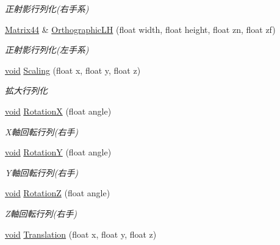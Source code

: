 \begin{DoxyCompactItemize}
\begin{DoxyCompactList}\small\item\em 正射影行列化(右手系) \end{DoxyCompactList}\item 
\mbox{\hyperlink{struct_effekseer_1_1_matrix44}{Matrix44}} \& \mbox{\hyperlink{struct_effekseer_1_1_matrix44_a8b53aee4d2c1598cbdd64ab6a6364af2}{Orthographic\+LH}} (float width, float height, float zn, float zf)
\begin{DoxyCompactList}\small\item\em 正射影行列化(左手系) \end{DoxyCompactList}\item 
\mbox{\hyperlink{namespace_effekseer_ab34c4088e512200cf4c2716f168deb56}{void}} \mbox{\hyperlink{struct_effekseer_1_1_matrix44_a973c274dff2d56d5f6b8453971ffe0ba}{Scaling}} (float x, float y, float z)
\begin{DoxyCompactList}\small\item\em 拡大行列化 \end{DoxyCompactList}\item 
\mbox{\hyperlink{namespace_effekseer_ab34c4088e512200cf4c2716f168deb56}{void}} \mbox{\hyperlink{struct_effekseer_1_1_matrix44_a79af751b490a7107a767d85f87d9faf7}{RotationX}} (float angle)
\begin{DoxyCompactList}\small\item\em X軸回転行列(右手) \end{DoxyCompactList}\item 
\mbox{\hyperlink{namespace_effekseer_ab34c4088e512200cf4c2716f168deb56}{void}} \mbox{\hyperlink{struct_effekseer_1_1_matrix44_a0c8f82d6551b691579d53278164806da}{RotationY}} (float angle)
\begin{DoxyCompactList}\small\item\em Y軸回転行列(右手) \end{DoxyCompactList}\item 
\mbox{\hyperlink{namespace_effekseer_ab34c4088e512200cf4c2716f168deb56}{void}} \mbox{\hyperlink{struct_effekseer_1_1_matrix44_a07b2387e64cdcf9227ca954a48d60e9f}{RotationZ}} (float angle)
\begin{DoxyCompactList}\small\item\em Z軸回転行列(右手) \end{DoxyCompactList}\item 
\mbox{\hyperlink{namespace_effekseer_ab34c4088e512200cf4c2716f168deb56}{void}} \mbox{\hyperlink{struct_effekseer_1_1_matrix44_af10dc0777b15b329cb33e173ce86924b}{Translation}} (float x, float y, float z)

\end{DoxyCompactItemize}
